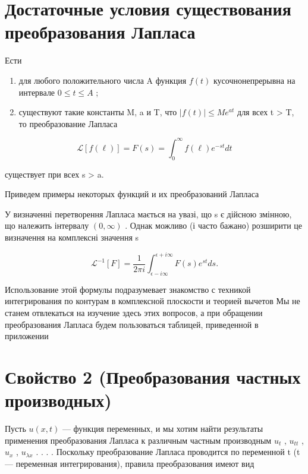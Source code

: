 \documentclass[
  ukrainian,
]{article}
\begin{document}
\section{Достаточные условия существования преобразования
Лапласа}\label{ux434ux43eux441ux442ux430ux442ux43eux447ux43dux44bux435-ux443ux441ux43bux43eux432ux438ux44f-ux441ux443ux449ux435ux441ux442ux432ux43eux432ux430ux43dux438ux44f-ux43fux440ux435ux43eux431ux440ux430ux437ux43eux432ux430ux43dux438ux44f-ux43bux430ux43fux43bux430ux441ux430}

Ести

\begin{enumerate}
\def\labelenumi{\arabic{enumi})}
\item
  для любого положительного числа A функция \(f(t)\) кусочнонепрерывна
  на интервале \(0 \le t \le A\) ;
\item
  существуют такие константы M, a и T, что \(|f(t)| \leq Me^{at}\) для
  всех t \textgreater{} T, то преобразование Лапласа
\end{enumerate}

\[
\mathscr{L}[f(\ell)] = F(s) = \int_{0}^{\infty} f(\ell) e^{-st} dt
\]

существует при всех s \textgreater{} a.

Приведем примеры некоторых функций и их преобразований Лапласа

У визначенні перетворення Лапласа мається на увазі, що s є дійсною
змінною, що належить інтервалу \((0, \infty)\) . Однак можливо (і часто
бажано) розширити це визначення на комплексні значення s

\[
\mathscr{L}^{-1}[F] = \frac{1}{2\pi i} \int_{\epsilon - i\infty}^{\epsilon + i\infty} F(s) e^{st} ds.
\]

Использование этой формулы подразумевает знакомство с техникой
интегрирования по контурам в комплексной плоскости и теорией вычетов Мы
не станем отвлекаться на изучение здесь этих вопросов, а при обращении
преобразования Лапласа будем пользоваться таблицей, приведенной в
приложении

\section{Свойство 2 (Преобразования частных
производных)}\label{ux441ux432ux43eux439ux441ux442ux432ux43e-2-ux43fux440ux435ux43eux431ux440ux430ux437ux43eux432ux430ux43dux438ux44f-ux447ux430ux441ux442ux43dux44bux445-ux43fux440ux43eux438ux437ux432ux43eux434ux43dux44bux445}

Пусть \(u(x, t)\) --- функция переменных, и мы хотим найти результаты
применения преобразования Лапласа к различным частным производным
\(u_t\) , \(u_{tt}\) , \(u_x\) , \(u_{\lambda x}\) . . . . Поскольку
преобразование Лапласа проводится по переменной t (t --- переменная
интегрирования), правила преобразования имеют вид
\end{document}

